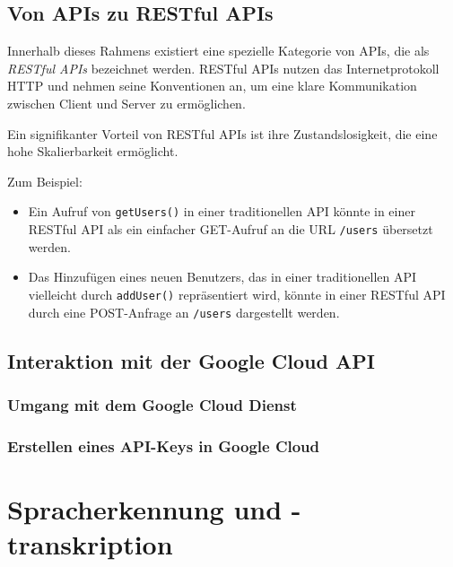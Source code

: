\documentclass[12pt,a4paper]{article}
\begin{document}
\subsection{Von APIs zu RESTful APIs}
Innerhalb dieses Rahmens existiert eine spezielle Kategorie von APIs, die als \textit{RESTful APIs} bezeichnet werden. RESTful APIs nutzen das Internetprotokoll HTTP und nehmen seine Konventionen an, um eine klare Kommunikation zwischen Client und Server zu ermöglichen.

Ein signifikanter Vorteil von RESTful APIs ist ihre Zustandslosigkeit, die eine hohe Skalierbarkeit ermöglicht. 

Zum Beispiel:

\begin{itemize}
	\item Ein Aufruf von \texttt{getUsers()} in einer traditionellen API könnte in einer RESTful API als ein einfacher GET-Aufruf an die URL \texttt{/users} übersetzt werden.
	\item Das Hinzufügen eines neuen Benutzers, das in einer traditionellen API vielleicht durch \texttt{addUser()} repräsentiert wird, könnte in einer RESTful API durch eine POST-Anfrage an \texttt{/users} dargestellt werden.
\end{itemize}


















\subsection{Interaktion mit der Google Cloud API}
\subsubsection{Umgang mit dem Google Cloud Dienst}
\subsubsection{Erstellen eines API-Keys in Google Cloud}




\newpage
\section{Spracherkennung und -transkription}
\end{document}
